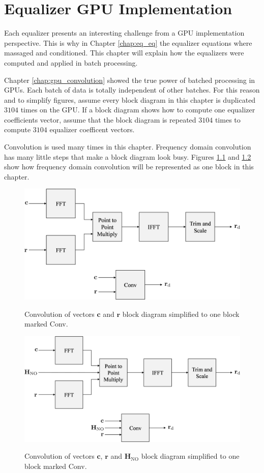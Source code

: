 \chapter{Equalizer GPU Implementation}
Each equalizer presents an interesting challenge from a GPU implementation perspective.
This is why in Chapter \ref{chap:eq_eq} the equalizer equations where massaged and conditioned.
This chapter will explain how the equalizers were computed and applied in batch processing.

Chapter \ref{chap:gpu_convolution} showed the true power of batched processing in GPUs.
Each batch of data is totally independent of other batches.
For this reason and to simplify figures, assume every block diagram in this chapter is duplicated $3104$ times on the GPU.
If a block diagram shows how to compute one equalizer coefficients vector, assume that the block diagram is repeated $3104$ times to compute $3104$ equalizer coefficent vectors.

Convolution is used many times in this chapter.
Frequency domain convolution has many little steps that make a block diagram look busy.
Figures \ref{fig:Conv2} and \ref{fig:Conv3} show how frequency domain convolution will be represented as one block in this chapter.
\begin{figure}
	\centering\includegraphics[width=9.27in/100*55]{figures/gpu_convolution/Conv2.pdf}
	\label{fig:Conv2}
	\caption{Convolution of vectors $\mathbf{c}$ and $\mathbf{r}$ block diagram simplified to one block marked Conv.}
\end{figure}
\begin{figure}
	\centering\includegraphics[width=9.27in/100*55]{figures/gpu_convolution/Conv3.pdf}
	\label{fig:Conv3}
	\caption{Convolution of vectors $\mathbf{c}$, $\mathbf{r}$ and $\mathbf{H}_{\text{NO}}$ block diagram simplified to one block marked Conv.}
\end{figure}


